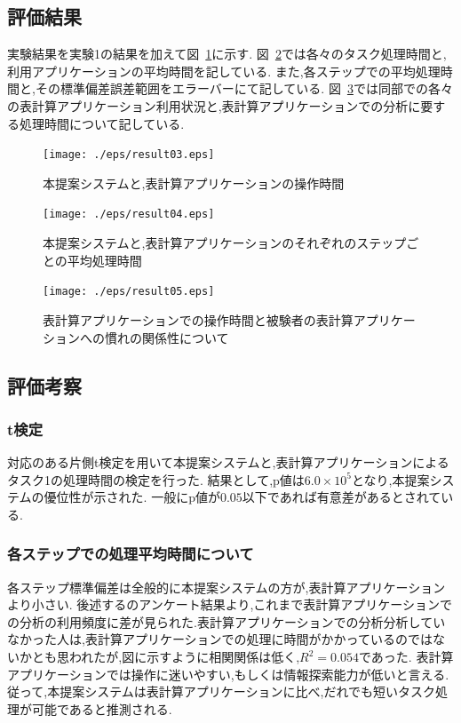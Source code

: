 \documentclass[sotsuron]{kuee}
\begin{document}
		\subsection{評価結果}
			実験結果を実験1の結果を加えて図~\ref{fig:result03}に示す.
			図~\ref{fig:result04}では各々のタスク処理時間と,利用アプリケーションの平均時間を記している.
			また,各ステップでの平均処理時間と,その標準偏差誤差範囲をエラーバーにて記している.
			図~\ref{fig:result05}では同部での各々の表計算アプリケーション利用状況と,表計算アプリケーションでの分析に要する処理時間について記している.
			\begin{figure}
				\begin{center}
					\texttt{[image: ./eps/result03.eps]}
				\end{center}
				\caption{本提案システムと,表計算アプリケーションの操作時間}
		  		\label{fig:result03}
			\end{figure}
			\begin{figure}
				\begin{center}
					\texttt{[image: ./eps/result04.eps]}
				\end{center}
				\caption{本提案システムと,表計算アプリケーションのそれぞれのステップごとの平均処理時間}
		  		\label{fig:result04}
			\end{figure}
			\begin{figure}
				\begin{center}
					\texttt{[image: ./eps/result05.eps]}
				\end{center}
				\caption{表計算アプリケーションでの操作時間と被験者の表計算アプリケーションへの慣れの関係性について}
		  		\label{fig:result05}
			\end{figure}
		\subsection{評価考察}
			\subsubsection{t検定}
				対応のある片側t検定を用いて本提案システムと,表計算アプリケーションによるタスク1の処理時間の検定を行った.
				結果として,p値は$6.0 \times 10^5$となり,本提案システムの優位性が示された.
				一般にp値が$0.05$以下であれば有意差があるとされている.
			\subsubsection{各ステップでの処理平均時間について}
				各ステップ標準偏差は全般的に本提案システムの方が,表計算アプリケーションより小さい.
				後述するのアンケート結果より,これまで表計算アプリケーションでの分析の利用頻度に差が見られた.表計算アプリケーションでの分析分析していなかった人は,表計算アプリケーションでの処理に時間がかかっているのではないかとも思われたが,図に示すように相関関係は低く,$R^2 = 0.054$であった.
				表計算アプリケーションでは操作に迷いやすい,もしくは情報探索能力が低いと言える.
				従って,本提案システムは表計算アプリケーションに比べ,だれでも短いタスク処理が可能であると推測される.
\end{document}
